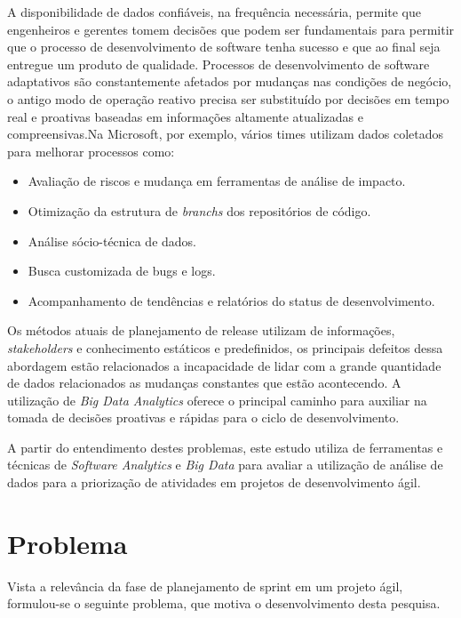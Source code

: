 A disponibilidade de dados confiáveis, na frequência necessária, permite que
engenheiros e gerentes tomem decisões que podem ser fundamentais para permitir
que o processo de desenvolvimento de software tenha sucesso e que ao final seja
entregue um produto de qualidade\cite{codemine}. Processos de desenvolvimento
de software adaptativos são constantemente afetados por mudanças nas condições
de negócio, o antigo modo de operação reativo precisa ser substituído por decisões
em tempo real e proativas baseadas em informações altamente atualizadas e
compreensivas\cite{artAndScience}.Na Microsoft, por exemplo, vários times utilizam
dados coletados para melhorar processos como:

\begin{itemize}
    \item Avaliação de riscos e mudança em ferramentas de análise de impacto.
    \item Otimização da estrutura de \textit{branchs} dos repositórios de código.
    \item Análise sócio-técnica de dados.
    \item Busca customizada de bugs e logs.
    \item Acompanhamento de tendências e relatórios do status de desenvolvimento.
\end{itemize}

Os métodos atuais de planejamento de release utilizam de informações, \textit{stakeholders}
e conhecimento estáticos e predefinidos, os principais defeitos dessa abordagem
estão relacionados a incapacidade de lidar com a grande quantidade de dados
relacionados as mudanças constantes que estão acontecendo. A utilização de
\textit{Big Data Analytics} oferece o principal caminho para auxiliar na tomada
de decisões proativas e rápidas para o ciclo de desenvolvimento\cite{artAndScience}.

A partir do entendimento destes problemas, este estudo utiliza de ferramentas
e técnicas de \textit{Software Analytics} e \textit{Big Data} para avaliar a
utilização de análise de dados para a priorização de atividades em projetos de
desenvolvimento ágil.

\section{Problema}

Vista a relevância da fase de planejamento de sprint em um projeto ágil,
formulou-se o seguinte problema, que motiva o desenvolvimento desta pesquisa.

